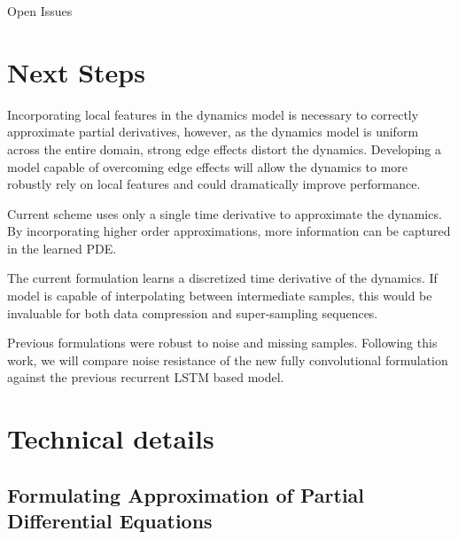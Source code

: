 \documentclass[12pt]{article}
\theoremstyle{plain}
\theoremstyle{remark}
\theoremstyle{definition}
\begin{document}
    \noindent Open Issues

    \section{Next Steps}

    \noindent Incorporating local features in the dynamics model is necessary to correctly approximate partial derivatives, however, as the dynamics model is uniform across the entire domain, strong edge effects distort the dynamics. Developing a model capable of overcoming edge effects will allow the dynamics to more robustly rely on local features and could dramatically improve performance.


    \noindent Current scheme uses only a single time derivative to approximate the dynamics. By incorporating higher order approximations, more information can be captured in the learned PDE.

    \noindent The current formulation learns a discretized time derivative of the dynamics. If model is capable of interpolating between intermediate samples, this would be invaluable for both data compression and super-sampling sequences.

    \noindent Previous formulations were robust to noise and missing samples. Following this work, we will compare noise resistance of the new fully convolutional formulation against the previous recurrent LSTM based model.

    \section{Technical details}

    \subsection{Formulating Approximation of Partial Differential Equations}
\end{document}
